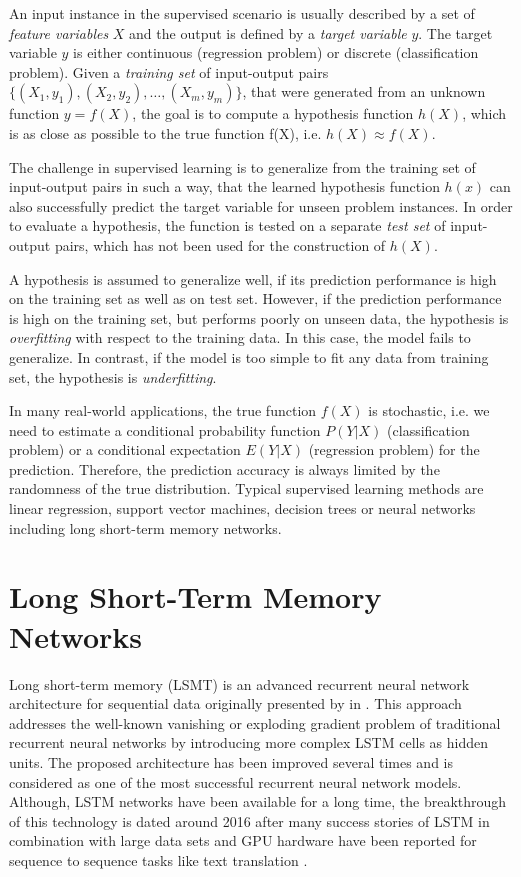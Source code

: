 An input instance in the supervised scenario is usually described by a set of \textit{feature variables} $X$ and the output is defined by a \textit{target variable} $y$.
The target variable $y$ is either continuous (regression problem) or discrete (classification problem).
Given a \textit{training set} of input-output pairs $\{(X_1, y_1), (X_2, y_2), \dots, (X_m,y_m)\}$, that were generated from an unknown function $y = f(X)$, the goal is to compute a hypothesis function $h(X)$, which is as close as possible to the true function f(X), i.e. $h(X) \approx f(X)$.

The challenge in supervised learning is to generalize from the training set of input-output pairs in such a way, that the learned hypothesis function $h(x)$ can also successfully predict the target variable for unseen problem instances.
In order to evaluate a hypothesis, the function is tested on a separate \textit{test set} of input-output pairs, which has not been used for the construction of $h(X)$.

A hypothesis is assumed to generalize well, if its prediction performance is high on the training set as well as on test set.
However, if the prediction performance is high on the training set, but performs poorly on unseen data, the hypothesis is \textit{overfitting} with respect to the training data.
In this case, the model fails to generalize.
In contrast, if the model is too simple to fit any data from training set, the hypothesis is \textit{underfitting}.

In many real-world applications, the true function $f(X)$ is stochastic, i.e. we need to estimate a conditional probability function $P(Y | X)$ (classification problem) or a conditional expectation $E(Y | X)$ (regression problem) for the prediction.
Therefore, the prediction accuracy is always limited by the randomness of the true distribution.
Typical supervised learning methods are linear regression, support vector machines, decision trees or neural networks including long short-term memory networks.
\section{Long Short-Term Memory Networks}

Long short-term memory (LSMT) is an advanced recurrent neural network architecture for sequential data originally presented by \citeauthor{DBLP:journals/neco/HochreiterS97} in \citeyear{DBLP:journals/neco/HochreiterS97}  \cite{DBLP:journals/neco/HochreiterS97}.
This approach addresses the well-known vanishing or exploding gradient problem \cite{DBLP:conf/icml/PascanuMB13}  of traditional recurrent neural networks by introducing more complex LSTM cells as hidden units.
The proposed architecture has been improved several times \cite{DBLP:journals/neco/GersSC00} \cite {DBLP:journals/tnn/GreffSKSS17} and is considered as one of the most successful recurrent neural network models.
Although, LSTM networks have been available for a long time, the breakthrough of this technology is dated around 2016 after many success stories of LSTM in combination with large data sets and GPU hardware have been reported for sequence to sequence tasks like text translation \cite{DBLP:journals/corr/WuSCLNMKCGMKSJL16}.

